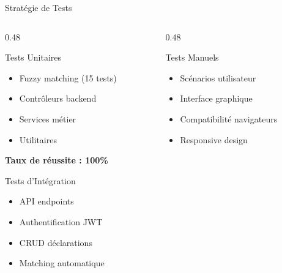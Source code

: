 \documentclass[aspectratio=169]{beamer}
\begin{document}
\begin{frame}{Stratégie de Tests}
    \begin{columns}[T]
        \begin{column}{0.48\textwidth}
            \begin{block}{Tests Unitaires}
                \begin{itemize}
                    \item Fuzzy matching (15 tests)
                    \item Contrôleurs backend
                    \item Services métier
                    \item Utilitaires
                \end{itemize}
                \textbf{Taux de réussite : 100\%}
            \end{block}

            \vspace{0.3cm}

            \begin{block}{Tests d'Intégration}
                \begin{itemize}
                    \item API endpoints
                    \item Authentification JWT
                    \item CRUD déclarations
                    \item Matching automatique
                \end{itemize}
            \end{block}
        \end{column}
        \begin{column}{0.48\textwidth}
            \begin{block}{Tests Manuels}
                \begin{itemize}
                    \item Scénarios utilisateur
                    \item Interface graphique
                    \item Compatibilité navigateurs
                    \item Responsive design
                \end{itemize}
            \end{block}

            \vspace{0.3cm}


\end{column}
\end{columns}
\end{frame}
\end{document}
